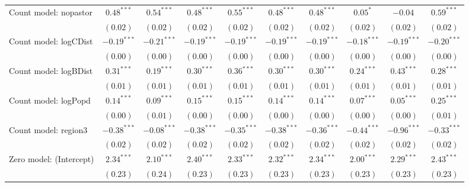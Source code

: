 \begin{sidewaystable}
\begin{center}
{\begin{tabular}{l c c c c c c c c c}
Count model: nopastor          & $0.48^{***}$  & $0.54^{***}$  & $0.48^{***}$  & $0.55^{***}$    & $0.48^{***}$  & $0.48^{***}$  & $0.05^{*}$    & $-0.04$        & $0.59^{***}$  \\
                               & $(0.02)$      & $(0.02)$      & $(0.02)$      & $(0.02)$        & $(0.02)$      & $(0.02)$      & $(0.02)$      & $(0.02)$       & $(0.02)$      \\
Count model: logCDist          & $-0.19^{***}$ & $-0.21^{***}$ & $-0.19^{***}$ & $-0.19^{***}$   & $-0.19^{***}$ & $-0.19^{***}$ & $-0.18^{***}$ & $-0.19^{***}$  & $-0.20^{***}$ \\
                               & $(0.00)$      & $(0.00)$      & $(0.00)$      & $(0.00)$        & $(0.00)$      & $(0.00)$      & $(0.00)$      & $(0.00)$       & $(0.00)$      \\
Count model: logBDist          & $0.31^{***}$  & $0.19^{***}$  & $0.30^{***}$  & $0.36^{***}$    & $0.30^{***}$  & $0.30^{***}$  & $0.24^{***}$  & $0.43^{***}$   & $0.28^{***}$  \\
                               & $(0.01)$      & $(0.01)$      & $(0.01)$      & $(0.01)$        & $(0.01)$      & $(0.01)$      & $(0.01)$      & $(0.01)$       & $(0.01)$      \\
Count model: logPopd           & $0.14^{***}$  & $0.09^{***}$  & $0.15^{***}$  & $0.15^{***}$    & $0.14^{***}$  & $0.14^{***}$  & $0.07^{***}$  & $0.05^{***}$   & $0.25^{***}$  \\
                               & $(0.00)$      & $(0.01)$      & $(0.00)$      & $(0.00)$        & $(0.00)$      & $(0.00)$      & $(0.00)$      & $(0.00)$       & $(0.01)$      \\
Count model: region3           & $-0.38^{***}$ & $-0.08^{***}$ & $-0.38^{***}$ & $-0.35^{***}$   & $-0.38^{***}$ & $-0.36^{***}$ & $-0.44^{***}$ & $-0.96^{***}$  & $-0.33^{***}$ \\
                               & $(0.02)$      & $(0.02)$      & $(0.02)$      & $(0.02)$        & $(0.02)$      & $(0.02)$      & $(0.02)$      & $(0.02)$       & $(0.02)$      \\
Zero model: (Intercept)        & $2.34^{***}$  & $2.10^{***}$  & $2.40^{***}$  & $2.33^{***}$    & $2.32^{***}$  & $2.34^{***}$  & $2.00^{***}$  & $2.29^{***}$   & $2.43^{***}$  \\
                               & $(0.23)$      & $(0.24)$      & $(0.23)$      & $(0.23)$        & $(0.23)$      & $(0.23)$      & $(0.23)$      & $(0.23)$       & $(0.23)$      \\

\end{tabular}}
\end{center}
\end{sidewaystable}
